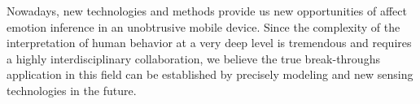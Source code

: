 Nowadays, new technologies and methods provide us new opportunities of affect emotion inference in an unobtrusive mobile device. Since the complexity of the interpretation of human behavior at a very deep level is tremendous and requires a highly interdisciplinary collaboration, we believe the true break-throughs application in this field can be established by precisely modeling and new sensing technologies in the future.